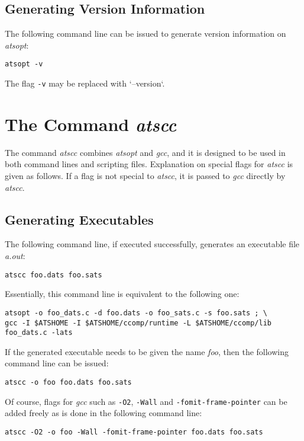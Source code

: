 \subsection{Generating Version Information}
The following command line can be issued to generate version information
on {\it atsopt}:
\begin{verbatim}
atsopt -v
\end{verbatim}
The flag \verb`-v` may be replaced with `--version`.


\section{The Command {\it atscc}}

The command {\it atscc} combines {\it atsopt} and {\it gcc}, and it is
designed to be used in both command lines and scripting files.  Explanation
on special flags for {\it atscc} is given as follows. If a flag is not
special to {\it atscc}, it is passed to {\it gcc} directly by {\it atscc}.

\subsection{Generating Executables}
The following command line, if executed successfully, generates an
executable file {\it a.out}:
\begin{verbatim}
atscc foo.dats foo.sats
\end{verbatim}
Essentially, this command line is equivalent to the following one:
\begin{verbatim}
atsopt -o foo_dats.c -d foo.dats -o foo_sats.c -s foo.sats ; \
gcc -I $ATSHOME -I $ATSHOME/ccomp/runtime -L $ATSHOME/ccomp/lib foo_dats.c -lats
\end{verbatim}

If the generated executable needs to be given the name {\it foo}, then
the following command line can be issued:
\begin{verbatim}
atscc -o foo foo.dats foo.sats
\end{verbatim}
Of course, flags for {\it gcc} such as \verb`-O2`, \verb`-Wall`
and \verb`-fomit-frame-pointer` can be added freely as is done in
the following command line:
\begin{verbatim}
atscc -O2 -o foo -Wall -fomit-frame-pointer foo.dats foo.sats
\end{verbatim}

